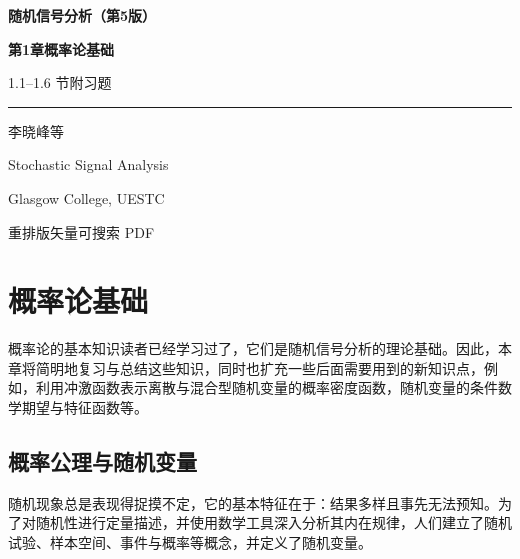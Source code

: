 \documentclass[11pt,openany,UTF8]{ctexbook}
\begin{document}
\begin{titlepage}
  \centering
  \vspace*{2.6cm}
  {\bfseries 随机信号分析（第5版\nobreak）\par}
  \vspace{1.0cm}
  {\bfseries 第1章\quad 概率论基础\par}
  \vspace{0.5cm}
  { 1.1–1.6 节\quad 附\quad 习题\par}
  \vspace{1.1cm}
  \rule{0.5\textwidth}{0.6pt}\par
  \vspace{1.1cm}
  { 李晓峰\quad 等\par}
  \vfill
  { Stochastic Signal Analysis\par}
  \vspace{0.25cm}
  { Glasgow College, UESTC\par}
  \vspace{1.2cm}
  { 重排版\quad\textperiodcentered\quad 矢量可搜索 PDF\par}
  \vspace{1.6cm}
\end{titlepage}

\tableofcontents
\thispagestyle{empty}
\clearpage
\setcounter{page}{1}

\chapter{概率论基础}

概率论的基本知识读者已经学习过了\nobreak，它们是随机信号分析的理论基础\nobreak。因此\nobreak，本章将简明地复习与总结这些知识\nobreak，同时也扩充一些后面需要用到的新知识点\nobreak，例如\nobreak，利用冲激函数表示离散与混合型随机变量的概率密度函数\nobreak，随机变量的条件数学期望与特征函数等\nobreak。

\section{概率公理与随机变量}

随机现象总是表现得捉摸不定\nobreak，它的基本特征在于\nobreak：结果多样且事先无法预知\nobreak。为了对随机性进行定量描述\nobreak，并使用数学工具深入分析其内在规律\nobreak，人们建立了随机试验\nobreak、样本空间\nobreak、事件与概率等概念\nobreak，并定义了随机变量\nobreak。
\end{document}
